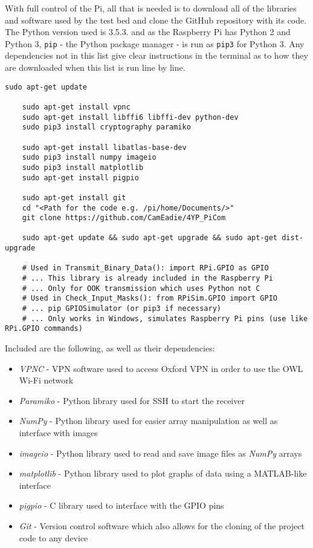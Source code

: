 \documentclass[../main.tex]{subfiles}
\begin{document}
With full control of the Pi, all that is needed is to download all of the libraries and software used by the test bed and clone the GitHub repository with its code.
The Python version used is 3.5.3. and as the Raspberry Pi has Python 2 and Python 3, \colorbox{backcolour}{\lstinline{pip}} - the Python package manager - is run as \colorbox{backcolour}{\lstinline{pip3}} for Python 3.
Any dependencies not in this list give clear instructions in the terminal as to how they are downloaded when this list is run line by line.\\

\begin{lstlisting}[caption=Libraries and Packages Required for the Test Bed,basicstyle=\footnotesize]
	sudo apt-get update
	
	sudo apt-get install vpnc
	sudo apt-get install libffi6 libffi-dev python-dev
	sudo pip3 install cryptography paramiko
	
	sudo apt-get install libatlas-base-dev
	sudo pip3 install numpy imageio
	sudo pip3 install matplotlib
	sudo apt-get install pigpio
	
	sudo apt-get install git
	cd "<Path for the code e.g. /pi/home/Documents/>"
	git clone https://github.com/CamEadie/4YP_PiCom

	sudo apt-get update && sudo apt-get upgrade && sudo apt-get dist-upgrade

	# Used in Transmit_Binary_Data(): import RPi.GPIO as GPIO
	# ... This library is already included in the Raspberry Pi
	# ... Only for OOK transmission which uses Python not C
	# Used in Check_Input_Masks(): from RPiSim.GPIO import GPIO
	# ... pip GPIOSimulator (or pip3 if necessary)
	# ... Only works in Windows, simulates Raspberry Pi pins (use like RPi.GPIO commands)
\end{lstlisting}

Included are the following, as well as their dependencies:\\

\begin{itemize}
	\item \textit{VPNC} - VPN software used to access Oxford VPN in order to use the OWL Wi-Fi network \cite{lib_VPNC}
	\item \textit{Paramiko} - Python library used for SSH to start the receiver \cite{lib_Paramiko}
	\item \textit{NumPy} - Python library used for easier array manipulation as well as interface with images \cite{lib_NumPy}
	\item \textit{imageio} - Python library used to read and save image files as \textit{NumPy} arrays \cite{lib_imageio}
	\item \textit{matplotlib} - Python library used to plot graphs of data using a MATLAB-like interface \cite{lib_matplotlib}
	\item \textit{pigpio} - C library used to interface with the GPIO pins \cite{lib_pigpio}
	\item \textit{Git} - Version control software which also allows for the cloning of the project code to any device \cite{lib_Git}
\end{itemize}
\end{document}
